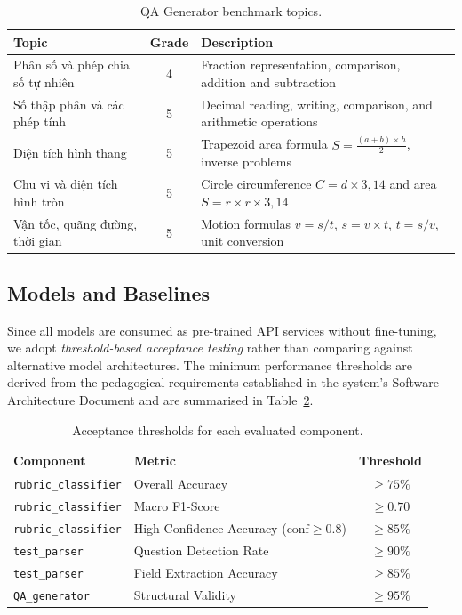 \documentclass[12pt, a4paper]{article}
\begin{document}
\begin{table}[H]
\centering
\caption{QA Generator benchmark topics.}
\label{tab:qa-topics}
\small
\begin{tabularx}{\textwidth}{X c X}
\toprule
\textbf{Topic} & \textbf{Grade} & \textbf{Description} \\
\midrule
Phân số và phép chia số tự nhiên & 4 & Fraction representation, comparison, addition and subtraction \\
Số thập phân và các phép tính     & 5 & Decimal reading, writing, comparison, and arithmetic operations \\
Diện tích hình thang               & 5 & Trapezoid area formula $S = \frac{(a+b) \times h}{2}$, inverse problems \\
Chu vi và diện tích hình tròn      & 5 & Circle circumference $C = d \times 3{,}14$ and area $S = r \times r \times 3{,}14$ \\
Vận tốc, quãng đường, thời gian   & 5 & Motion formulas $v = s/t$, $s = v \times t$, $t = s/v$, unit conversion \\
\bottomrule
\end{tabularx}
\end{table}

\subsection{Models and Baselines}

Since all models are consumed as pre-trained API services without fine-tuning, we adopt \emph{threshold-based acceptance testing} rather than comparing against alternative model architectures. The minimum performance thresholds are derived from the pedagogical requirements established in the system's Software Architecture Document and are summarised in Table~\ref{tab:thresholds}.

\begin{table}[H]
\centering
\caption{Acceptance thresholds for each evaluated component.}
\label{tab:thresholds}
\small
\begin{tabular}{l l c}
\toprule
\textbf{Component} & \textbf{Metric} & \textbf{Threshold} \\
\midrule
\texttt{rubric\_classifier} & Overall Accuracy & $\geq 75\%$ \\
\texttt{rubric\_classifier} & Macro F1-Score & $\geq 0.70$ \\
\texttt{rubric\_classifier} & High-Confidence Accuracy ($\text{conf} \geq 0.8$) & $\geq 85\%$ \\
\texttt{test\_parser} & Question Detection Rate & $\geq 90\%$ \\
\texttt{test\_parser} & Field Extraction Accuracy & $\geq 85\%$ \\
\texttt{QA\_generator} & Structural Validity & $\geq 95\%$ \\
\bottomrule
\end{tabular}
\end{table}
\end{document}
